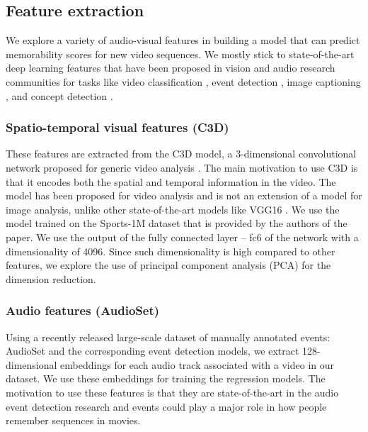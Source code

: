 \documentclass[sigconf]{acmart}
\begin{document}
\subsection{Feature extraction}
\label{feat-extr}
We explore a variety of audio-visual features in building a model that can predict memorability scores for new video sequences.
We mostly stick to state-of-the-art deep learning features that have been proposed in vision and audio research communities for tasks like video classification \cite{c3d-feat}, event detection \cite{audioset-feat}, image captioning \cite{caption-feat}, and concept detection \cite{sb-feat}. 

\subsubsection{Spatio-temporal visual features (C3D)}
\label{c3d-feat}
These features are extracted from the C3D model, a 3-dimensional convolutional network proposed for generic video analysis \cite{c3d-feat}. 
The main motivation to use C3D is that it encodes both the spatial and temporal information in the video.
The model has been proposed for video analysis and is not an extension of a model for image analysis, unlike other state-of-the-art models like VGG16 \cite{vgg16}.
We use the model trained on the Sports-1M dataset \cite{c3d-feat} that is provided by the authors of the paper.
We use the output of the fully connected layer -- fc6 of the network with a dimensionality of 4096.
Since such dimensionality is high compared to other features, we explore the use of principal component analysis (PCA) for the dimension reduction.

\subsubsection{Audio features (AudioSet)}
\label{as-feat}
Using a recently released large-scale dataset of manually annotated events: AudioSet \cite{audioset-feat} and the corresponding event detection models, we extract 128-dimensional embeddings for each audio track associated with a video in our dataset.
We use these embeddings for training the regression models.
The motivation to use these features is that they are state-of-the-art in the audio event detection research and events could play a major role in how people remember sequences in movies.
\end{document}
